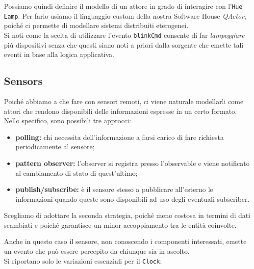 \documentclass{../llncs}
\newcommand{\codescript}[1]{{\mbox{\small{\texttt{#1}}}}\xspace}
\newcommand{\qa}{\textsf{\textit{QActor}}}
\begin{document}
Possiamo quindi definire il modello di un attore in grado di interagire con l'\texttt{Hue Lamp}. Per farlo usiamo il linguaggio custom della nostra Software House \qa, poiché ci permette di modellare sistemi distribuiti eterogenei.\\



Si noti come la scelta di utilizzare l'evento \codescript{blinkCmd} consente di far \textit{lampeggiare} più dispositivi senza che questi siano noti a priori dalla sorgente che emette tali eventi in base alla logica applicativa.

\subsection{Sensors}
Poiché abbiamo a che fare con sensori remoti, ci viene naturale modellarli come attori che rendono disponibili delle informazioni espresse in un certo formato.\\
Nello specifico, sono possibili tre approcci:
\begin{itemize}
\item \textbf{polling:} chi necessita dell'informazione a farsi carico di fare richiesta periodicamente al sensore;
\item \textbf{pattern observer:} l'observer si registra presso l'observable e viene notificato al cambiamento di stato di quest'ultimo;
\item \textbf{publish/subscribe:} è il sensore stesso a pubblicare all'esterno le informazioni quando queste sono disponibili ad uso degli eventuali subscriber.
\end{itemize}
Scegliamo di adottare la seconda strategia, poiché meno costosa in termini di dati scambiati e poiché garantisce un minor accoppiamento tra le entità coinvolte.

Anche in questo caso il sensore, non conoscendo i componenti interessati, emette un evento che può essere percepito da chiunque sia in ascolto.\\



\noindent Si riportano solo le variazioni essenziali per il \texttt{Clock}:


\end{document}
